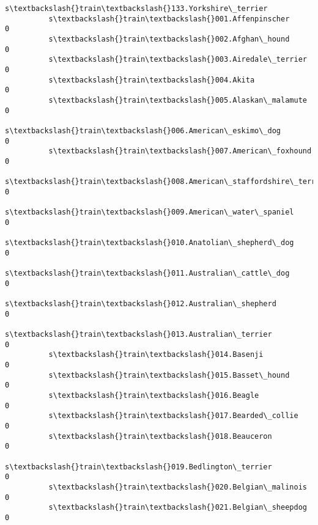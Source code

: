 \documentclass[11pt]{article}
\begin{document}
\begin{Verbatim}[commandchars=\\\{\}]
                                                          s\textbackslash{}train\textbackslash{}133.Yorkshire\_terrier  
          s\textbackslash{}train\textbackslash{}001.Affenpinscher                                                   0  
          s\textbackslash{}train\textbackslash{}002.Afghan\_hound                                                    0  
          s\textbackslash{}train\textbackslash{}003.Airedale\_terrier                                                0  
          s\textbackslash{}train\textbackslash{}004.Akita                                                           0  
          s\textbackslash{}train\textbackslash{}005.Alaskan\_malamute                                                0  
          s\textbackslash{}train\textbackslash{}006.American\_eskimo\_dog                                             0  
          s\textbackslash{}train\textbackslash{}007.American\_foxhound                                               0  
          s\textbackslash{}train\textbackslash{}008.American\_staffordshire\_terrier                                  0  
          s\textbackslash{}train\textbackslash{}009.American\_water\_spaniel                                          0  
          s\textbackslash{}train\textbackslash{}010.Anatolian\_shepherd\_dog                                          0  
          s\textbackslash{}train\textbackslash{}011.Australian\_cattle\_dog                                           0  
          s\textbackslash{}train\textbackslash{}012.Australian\_shepherd                                             0  
          s\textbackslash{}train\textbackslash{}013.Australian\_terrier                                              0  
          s\textbackslash{}train\textbackslash{}014.Basenji                                                         0  
          s\textbackslash{}train\textbackslash{}015.Basset\_hound                                                    0  
          s\textbackslash{}train\textbackslash{}016.Beagle                                                          0  
          s\textbackslash{}train\textbackslash{}017.Bearded\_collie                                                  0  
          s\textbackslash{}train\textbackslash{}018.Beauceron                                                       0  
          s\textbackslash{}train\textbackslash{}019.Bedlington\_terrier                                              0  
          s\textbackslash{}train\textbackslash{}020.Belgian\_malinois                                                0  
          s\textbackslash{}train\textbackslash{}021.Belgian\_sheepdog                                                0  

\end{Verbatim}
\end{document}
